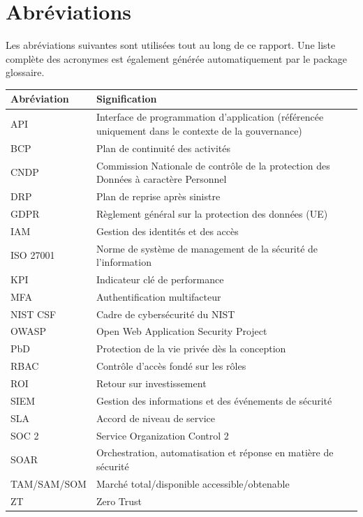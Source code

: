 \chapter*{Abréviations}

Les abréviations suivantes sont utilisées tout au long de ce rapport. Une liste complète des acronymes est également générée automatiquement par le package glossaire.

\begin{longtable}{@{}p{3.2cm}p{10.5cm}@{}}
\toprule
\textbf{Abréviation} & \textbf{Signification} \\
\midrule
\endhead
API & Interface de programmation d'application (référencée uniquement dans le contexte de la gouvernance) \\
BCP & Plan de continuité des activités \\
CNDP & Commission Nationale de contrôle de la protection des Données à caractère Personnel \\
DRP & Plan de reprise après sinistre \\
GDPR & Règlement général sur la protection des données (UE) \\
IAM & Gestion des identités et des accès \\
ISO 27001 & Norme de système de management de la sécurité de l'information \\
KPI & Indicateur clé de performance \\
MFA & Authentification multifacteur \\
NIST CSF & Cadre de cybersécurité du NIST \\
OWASP & Open Web Application Security Project \\
PbD & Protection de la vie privée dès la conception \\
RBAC & Contrôle d'accès fondé sur les rôles \\
ROI & Retour sur investissement \\
SIEM & Gestion des informations et des événements de sécurité \\
SLA & Accord de niveau de service \\
SOC 2 & Service Organization Control 2 \\
SOAR & Orchestration, automatisation et réponse en matière de sécurité \\
TAM/SAM/SOM & Marché total/disponible accessible/obtenable \\
ZT & Zero Trust \\
\bottomrule
\end{longtable}
